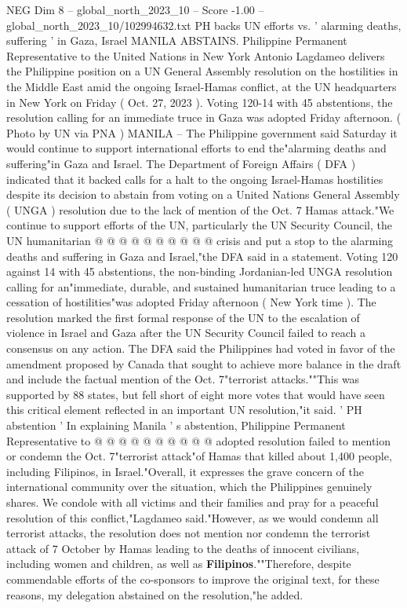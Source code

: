 \begin{textsample}{NEG Dim 8 – global\_north\_2023\_10 – Score -1.00 – global\_north\_2023\_10/102994632.txt}  \label{ex:f8_neg_246}
PH backs UN efforts vs. ' alarming deaths, suffering ' in Gaza, Israel MANILA ABSTAINS.
Philippine Permanent Representative to the United Nations in New York Antonio Lagdameo delivers the Philippine position on a UN General Assembly resolution on the hostilities in the Middle East amid the ongoing Israel-Hamas conflict, at the UN headquarters in New York on Friday ( Oct. 27, 2023 ).
Voting 120-14 with 45 abstentions, the resolution calling for an immediate truce in Gaza was adopted Friday afternoon. ( Photo by UN via PNA ) MANILA -- The Philippine government said Saturday it would continue to support international efforts to end the"alarming deaths and suffering"in Gaza and Israel.
The Department of Foreign Affairs ( DFA ) indicated that it backed calls for a halt to the ongoing Israel-Hamas hostilities despite its decision to abstain from voting on a United Nations General Assembly ( UNGA ) resolution due to the lack of mention of the Oct. 7 Hamas attack."We continue to support efforts of the UN, particularly the UN Security Council, the UN humanitarian @ @ @ @ @ @ @ @ @ @ crisis and put a stop to the alarming deaths and suffering in Gaza and Israel,"the DFA said in a statement.
Voting 120 against 14 with 45 abstentions, the non-binding Jordanian-led UNGA resolution calling for an"immediate, durable, and sustained humanitarian truce leading to a cessation of hostilities"was adopted Friday afternoon ( New York time ).
The resolution marked the first formal response of the UN to the escalation of violence in Israel and Gaza after the UN Security Council failed to reach a consensus on any action.
The DFA said the Philippines had voted in favor of the amendment proposed by Canada that sought to achieve more balance in the draft and include the factual mention of the Oct. 7"terrorist attacks.""This was supported by 88 states, but fell short of eight more votes that would have seen this critical element reflected in an important UN resolution,"it said. ' PH abstention ' In explaining Manila ' s abstention, Philippine Permanent Representative to @ @ @ @ @ @ @ @ @ @ adopted resolution failed to mention or condemn the Oct. 7"terrorist attack"of Hamas that killed about 1,400 people, including Filipinos, in Israel."Overall, it expresses the grave concern of the international community over the situation, which the Philippines genuinely shares.
We condole with all victims and their families and pray for a peaceful resolution of this conflict,"Lagdameo said."However, as we would condemn all terrorist attacks, the resolution does not mention nor condemn the terrorist attack of 7 October by Hamas leading to the deaths of innocent civilians, including women and children, as well as \textbf{Filipinos}.""Therefore, despite commendable efforts of the co-sponsors to improve the original text, for these reasons, my delegation abstained on the resolution,"he added.

\end{textsample}
